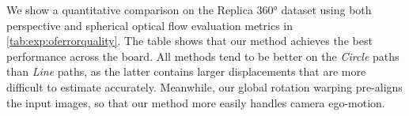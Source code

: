 We show a quantitative comparison on the Replica 360° dataset using both perspective and spherical optical flow evaluation metrics in \cref{tab:exp:oferrorquality}.
%
The table
shows that our method achieves the best performance across the board.
%
All methods tend to be better on the \emph{Circle} paths than \emph{Line} paths, as the latter contains larger displacements that are more difficult to estimate accurately.
%
Meanwhile, our global rotation warping pre-aligns the input images, so that our method more easily handles camera ego-motion.


